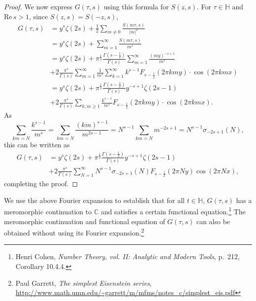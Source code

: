 \documentclass{article}
\def\Re{\ensuremath{\mathrm{Re}}\,}
\theoremstyle{definition}
\theoremstyle{definition}
\begin{document}
\begin{proof}
We now express $G(\tau,s)$ using this formula for $S(z,s)$.
For $\tau \in \mathbb{H}$
and $\Re s>1$, since $S(z,s)=S(-z,s)$,
\begin{align*}
G(\tau,s)&=y^s \zeta(2s) +\frac{1}{2}\sum_{m \neq 0} \frac{S(m\tau,s)}{|m|^s}\\
&=y^s \zeta(2s) + \sum_{m=1}^\infty \frac{S(m\tau,s)}{m^s}\\
&=y^s \zeta(2s) +\pi^{\frac{1}{2}} \frac{ \Gamma\left(s-\frac{1}{2}\right)}{\Gamma(s)} \sum_{m=1}^\infty \frac{(my)^{-s+1}}{m^s}\\
&+2 \frac{\pi^s}{\Gamma(s)} \sum_{m=1}^\infty \frac{1}{m^s} \sum_{k=1}^\infty k^{s-1} F_{s-\frac{1}{2}}(2\pi kmy) \cdot \cos(2\pi kmx)\\
&=y^s \zeta(2s)   +\pi^{\frac{1}{2}} \frac{ \Gamma\left(s-\frac{1}{2}\right)}{\Gamma(s)} y^{-s+1} \zeta(2s-1)\\
&+2 \frac{\pi^s}{\Gamma(s)} \sum_{k,m \geq 1} \frac{k^{s-1}}{m^s} F_{s-\frac{1}{2}}(2\pi kmy) \cdot \cos(2\pi kmx).
\end{align*}
As
\[
\sum_{km=N} \frac{k^{s-1}}{m^s} = \sum_{km=N} \frac{(km)^{s-1}}{m^{2s-1}} 
= N^{s-1} \sum_{km=N} m^{-2s+1}
=N^{s-1} \sigma_{-2s+1}(N),
\]
this can be written as
\begin{align*}
G(\tau,s)&=y^s \zeta(2s)   +\pi^{\frac{1}{2}} \frac{ \Gamma\left(s-\frac{1}{2}\right)}{\Gamma(s)} y^{-s+1} \zeta(2s-1)\\
&+2 \frac{\pi^s}{\Gamma(s)} \sum_{N=1}^\infty N^{s-1} \sigma_{-2s+1}(N) F_{s-\frac{1}{2}}(2\pi Ny) \cos(2\pi Nx),
\end{align*}
completing the proof.
\end{proof}




We use the above Fourier expansion to establish that for all $t \in \mathbb{H}$, $G(\tau,s)$ 
has a meromorphic continuation
to $\mathbb{C}$ and
satisfies a certain functional equation.\footnote{Henri Cohen, {\em Number Theory, vol. II: Analytic and Modern Tools}, p.~212, Corollary 10.4.4.}
The meromorphic continuation and functional equation of $G(\tau,s)$ can also be obtained without using its Fourier expansion.\footnote{Paul Garrett, {\em The simplest Eisenstein series},
\url{http://www.math.umn.edu/~garrett/m/mfms/notes_c/simplest_eis.pdf}}
\end{document}
